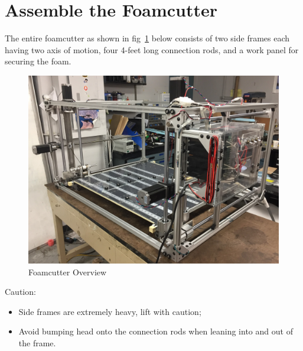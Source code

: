 \documentclass[titlepage,12pt,letter]{report}
\numberwithin{equation}{chapter}
\begin{document}
\newpage



\section{Assemble the Foamcutter}
\label{sec:assemble}

The entire foamcutter as shown in fig~\ref{fig:overview} below consists of two side frames each having two axis of motion, four 4-feet long connection rods, and a work panel for securing the foam. 

\begin{figure} [H]
	\includegraphics[width = 0.9\linewidth]{./Figures/overview.jpg}
	\caption{Foamcutter Overview}
	\label{fig:overview}
\end{figure}

\begin{tcolorbox}
	{\large
		\noindent Caution:
		\begin{itemize}[noitemsep,topsep=0pt]
			\item Side frames are extremely heavy, lift with caution;
			\item Avoid bumping head onto the connection rods when leaning into and out of the frame.
		\end{itemize}
	}
\end{tcolorbox}
\end{document}
